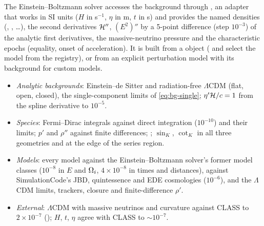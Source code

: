 The Einstein--Boltzmann solver accesses the background through , an adapter that works in SI
units ($H$ in s$^{-1}$, $\eta$ in m, $t$ in s) and provides the named densities (, , \ldots),
the second derivatives $\mathcal{H}''$, $(E^2)''$ by a 5-point difference (step $10^{-3}$) of the analytic first derivatives,
the massive-neutrino pressure and the characteristic epochs (equality, onset of acceleration). It is built from a
 object ( and  select the model from the
registry), or from an explicit perturbation model with its background for custom models.

\begin{validation}
\begin{itemize}
\item \emph{Analytic backgrounds}: Einstein--de Sitter and radiation-free $\Lambda$CDM (flat, open, closed), the
      single-component limits of \cref{eq:bg-single}; $\eta'\mathcal{H}/c=1$ from the spline derivative to $10^{-5}$.
\item \emph{Species}: Fermi--Dirac integrals against direct integration ($10^{-10}$) and their limits; $p'$ and
      $\rho''$ against finite differences; ; $\sin_K$, $\cot_K$ in all three geometries and at the
      edge of the series region.
\item \emph{Models}: every model against the Einstein--Boltzmann solver's former model classes ($10^{-8}$ in $E$
      and $\Omega_i$, $4\times10^{-8}$ in times and distances), against SimulationCode's JBD, quintessence and EDE
      cosmologies ($10^{-6}$), and the $\Lambda$CDM limits, trackers, closure and finite-difference $\rho'$.
\item \emph{External}: $\Lambda$CDM with massive neutrinos and curvature against CLASS to $2\times10^{-7}$
      (); $H$, $t$, $\eta$ agree with CLASS to $\sim10^{-7}$.
\end{itemize}
\end{validation}
